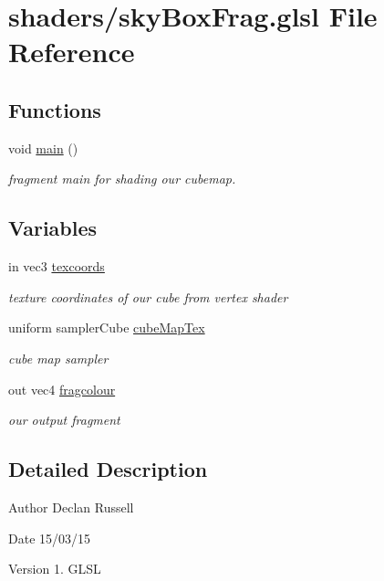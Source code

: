 \hypertarget{sky_box_frag_8glsl}{\section{shaders/sky\-Box\-Frag.glsl File Reference}
\label{sky_box_frag_8glsl}
}
\subsection*{Functions}
\begin{DoxyCompactItemize}
\item 
\hypertarget{sky_box_frag_8glsl_acdef7a1fd863a6d3770c1268cb06add3}{void \hyperlink{sky_box_frag_8glsl_acdef7a1fd863a6d3770c1268cb06add3}{main} ()}\label{sky_box_frag_8glsl_acdef7a1fd863a6d3770c1268cb06add3}

\begin{DoxyCompactList}\small\item\em fragment main for shading our cubemap. \end{DoxyCompactList}\end{DoxyCompactItemize}
\subsection*{Variables}
\begin{DoxyCompactItemize}
\item 
\hypertarget{sky_box_frag_8glsl_a4989ba8cb91a639702eb2204f23cf73f}{in vec3 \hyperlink{sky_box_frag_8glsl_a4989ba8cb91a639702eb2204f23cf73f}{texcoords}}\label{sky_box_frag_8glsl_a4989ba8cb91a639702eb2204f23cf73f}

\begin{DoxyCompactList}\small\item\em texture coordinates of our cube from vertex shader \end{DoxyCompactList}\item 
\hypertarget{sky_box_frag_8glsl_a9dac566b8dcb58f380dec54a9a51b3fa}{uniform sampler\-Cube \hyperlink{sky_box_frag_8glsl_a9dac566b8dcb58f380dec54a9a51b3fa}{cube\-Map\-Tex}}\label{sky_box_frag_8glsl_a9dac566b8dcb58f380dec54a9a51b3fa}

\begin{DoxyCompactList}\small\item\em cube map sampler \end{DoxyCompactList}\item 
\hypertarget{sky_box_frag_8glsl_ae6bde93c13ab90b831d2986a7de2d347}{out vec4 \hyperlink{sky_box_frag_8glsl_ae6bde93c13ab90b831d2986a7de2d347}{fragcolour}}\label{sky_box_frag_8glsl_ae6bde93c13ab90b831d2986a7de2d347}

\begin{DoxyCompactList}\small\item\em our output fragment \end{DoxyCompactList}\end{DoxyCompactItemize}


\subsection{Detailed Description}
\begin{DoxyAuthor}{Author}
Declan Russell 
\end{DoxyAuthor}
\begin{DoxyDate}{Date}
15/03/15 
\end{DoxyDate}
\begin{DoxyVersion}{Version}
1.  G\-L\-S\-L 
\end{DoxyVersion}
